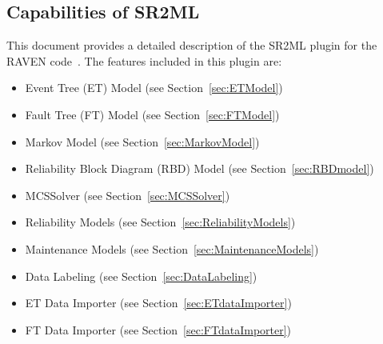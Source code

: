 \subsection{Capabilities of SR2ML}
This document provides a detailed description of the SR2ML plugin for the RAVEN code~\cite{RAVEN,RAVENtheoryMan}.
The features included in this plugin are:
\begin{itemize}
	\item Event Tree (ET) Model (see Section~\ref{sec:ETModel})
	\item Fault Tree (FT) Model (see Section~\ref{sec:FTModel})
	\item Markov Model (see Section~\ref{sec:MarkovModel})
	\item Reliability Block Diagram (RBD) Model (see Section~\ref{sec:RBDmodel})
	\item MCSSolver (see Section~\ref{sec:MCSSolver})
	\item Reliability Models (see Section~\ref{sec:ReliabilityModels})
  \item Maintenance Models (see Section~\ref{sec:MaintenanceModels})
	\item Data Labeling (see Section~\ref{sec:DataLabeling})
	\item ET Data Importer (see Section~\ref{sec:ETdataImporter})
	\item FT Data Importer (see Section~\ref{sec:FTdataImporter})
\end{itemize}
